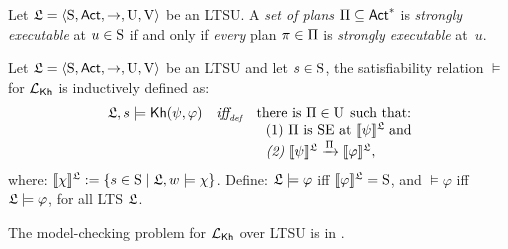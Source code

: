     \medskip
    
    
    \begin{definition}\label{def:plans-exec}
    Let $\model=\tup{\S,\ACT,\ra,\Unc,\V}$ be an LTSU. A \emph{set of plans} $\plans \subseteq \ACT^*$ is \emph{strongly executable} at $u \in \S$ if and only if \emph{every} plan $\plan \in \plans$ is \emph{strongly executable} at~$u$.
    \end{definition}

    \begin{definition} \label{def:semantics-kh-uncertain}
        Let $\model = \tup{\S,\ACT,\ra,\Unc,\V}$ be an LTSU and let $s\in\S$, the satisfiability relation $\models$ for $\Khlogic$ is inductively defined as:
        \[
        \begin{array}{l@{\ \ \ }c@{\ \ \  }l}
        \model, s \models \kh(\psi,\varphi) & \iffdef & \text{there is } \plans \in \Unc \;\text{such that:} \\
        & & \ \ \text{\rm (1)} \ \plans \text{ is SE at }  \truthset{\model}{\psi}\; \text{and} \\
        & & \ \ \text{\em (2)} \ \truthset{\model}{\psi} \reach{\plans} \truthset{\model}{\varphi}, 
        \end{array}
        \]      where: $\truthset{\model}{\chi} := \csetsc{s\in\S}{\model,w\models\chi}$. Define: $\model\models\varphi$ iff  $\truthset{\model}{\varphi}=\S$, and $\models\varphi$ iff $\model\models\varphi$, for all LTS $\model$.
    \end{definition}
    

    \begin{proposition}
        The model-checking problem for $\Khlogic$ over LTSU is in \PTIME.
    \end{proposition}